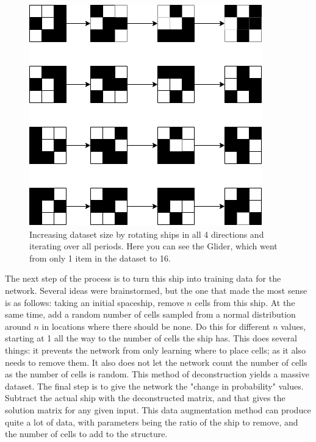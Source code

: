 \documentclass{l4proj}
\begin{document}
\begin{figure}[h]
\centering
\includegraphics[width=\textwidth]{dissertation/images/diagrams/increasing_ship_data.png} 
\caption{Increasing dataset size by rotating ships in all 4 directions and iterating over all periods. Here you can see the Glider, which went from only 1 item in the dataset to 16.}
\label{fig:subim1}
\end{figure}

The next step of the process is to turn this ship into training data for the network. Several ideas were brainstormed, but the one that made the most sense is as follows: taking an initial spaceship, remove $n$ cells from this ship. At the same time, add a random number of cells sampled from a normal distribution around $n$ in locations where there should be none. Do this for different $n$ values, starting at 1 all the way to the number of cells the ship has. This does several things: it prevents the network from only learning where to place cells; as it also needs to remove them. It also does not let the network count the number of cells as the number of cells is random. This method of deconstruction yields a massive dataset. The final step is to give the network the "change in probability" values. Subtract the actual ship with the deconstructed matrix, and that gives the solution matrix for any given input. This data augmentation method can produce quite a lot of data, with parameters being the ratio of the ship to remove, and the number of cells to add to the structure.
\end{document}
